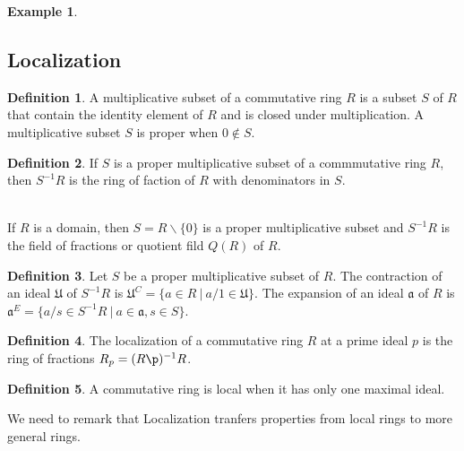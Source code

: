 \documentclass[11pt]{amsbook}%
\theoremstyle{plain}
\theoremstyle{definition}
\newtheorem{definition*}{Definition}
\newtheorem*{example*}{Example}
\numberwithin{equation}{section}
\newcommand{\af}{\mathfrak a}
\newcommand{\UF}{\mathfrak U}
\begin{document}
\begin{example*}
\subsection{Localization}

\begin{definition*}
  \label{def-localization}
  A multiplicative subset of a commutative ring $R$ is a subset $S$ of $R$ that contain the identity element of $R$ and
is closed under multiplication. A multiplicative subset $S$ is proper when $0 \notin S$.
\end{definition*}

\begin{definition*}
  If $S$ is a proper multiplicative subset of a commmutative ring $R$, then $S^{-1}R$ is the ring of faction of
  $R$ with denominators in $S$.
\end{definition*} \\
If $R$ is a domain, then $S = R\backslash \{0\}$ is a proper multiplicative subset
and $S^{-1}R$ is the field of fractions or quotient fild $Q(R)$ of $R$.

\begin{definition*}
  Let $S$ be a proper multiplicative subset of $R$. The contraction of an ideal
  $\UF$ of $S^{-1}R$ is $\UF^{C} = \{a \in R \ | \ a/1 \in \UF\}$. The expansion
  of an ideal $\af$ of $R$ is $\af^{E} = \{a/s \in S^{-1}R \ | \ a \in \af, s \in S\}$.
\end{definition*}

\begin{definition*}
  The localization of a commutative ring $R$ at a prime ideal $p$ is the ring
  of fractions $R_{p} = (R\p)^{-1}R$.
\end{definition*}

\begin{definition*}
  A commutative ring is local when it has only one maximal ideal.
\end{definition*}
We need to remark that Localization tranfers properties from local rings to more general rings.


\end{example*}
\end{document}
